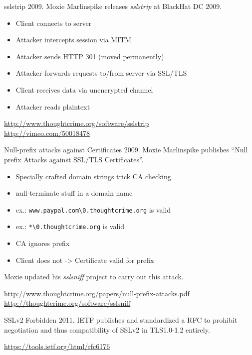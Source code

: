 \begin{frame}{sslstrip}
  2009. Moxie Marlinspike releases \emph{sslstrip} at BlackHat DC 2009.

  \begin{itemize}
    \item Client connects to server
    \item Attacker intercepts session via MITM
    \item Attacker sends HTTP 301 (moved permanently)
    \item Attacker forwards requests to/from server via SSL/TLS
    \item Client receives data via unencrypted channel
    \item Attacker reads plaintext
  \end{itemize}
  
  \vspace{50px}

  \tiny
  \url{http://www.thoughtcrime.org/software/sslstrip}\\
  \url{http://vimeo.com/50018478}
\end{frame}

\begin{frame}{Null-prefix attacks against Certificates}
  2009. Moxie Marlinspike publishes ``Null prefix Attacks against SSL/TLS Certificates''.

  \begin{itemize}
    \item Specially crafted domain strings trick CA checking
    \item null-terminate stuff in a domain name
    \item ex.: \texttt{www.paypal.com\textbackslash0.thoughtcrime.org} is valid
    \item ex.: \texttt{*\textbackslash0.thoughtcrime.org} is valid
    \item CA ignores prefix 
    \item Client does not -> Certificate valid for prefix
  \end{itemize}
  Moxie updated his \emph{sslsniff} project to carry out this attack.
  
  \vspace{30px}

  \tiny
  \url{http://www.thoughtcrime.org/papers/null-prefix-attacks.pdf}\\
  \url{http://thoughtcrime.org/software/sslsniff}
\end{frame}


\begin{frame}{SSLv2 Forbidden}
  2011. IETF publishes and standardized a RFC to prohibit negotiation and thus compatibility of SSLv2 in TLS1.0-1.2 entirely. 
  
  \vspace{140px}

  \tiny
  \url{https://tools.ietf.org/html/rfc6176}
\end{frame}

